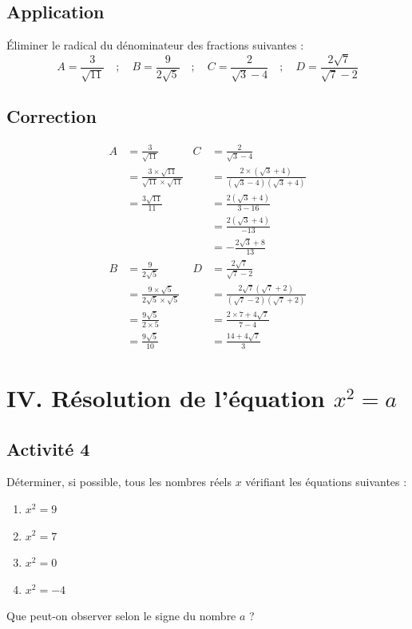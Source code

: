 \documentclass[12pt,a4paper]{article}
\begin{document}
\subsection*{\color{myred} Application }
\begin{tcolorbox}[colback=red!5!white,colframe=myred,title=\textbf{Application}]
Éliminer le radical du dénominateur des fractions suivantes :
\[
A = \frac{3}{\sqrt{11}} \quad;\quad B = \frac{9}{2\sqrt{5}} \quad;\quad C = \frac{2}{\sqrt{3} - 4} \quad;\quad D = \frac{2\sqrt{7}}{\sqrt{7} - 2}
\]
\end{tcolorbox}
\subsection*{\color{myred} Correction }
\begin{align*}
A &= \frac{3}{\sqrt{11}} & C &= \frac{2}{\sqrt{3} - 4} \\
&= \frac{3 \times \sqrt{11}}{\sqrt{11} \times \sqrt{11}} & &= \frac{2 \times \left(\sqrt{3} + 4\right)}{\left(\sqrt{3} - 4\right)\left(\sqrt{3} + 4\right)} \\
&= \frac{3\sqrt{11}}{11} & &= \frac{2\left(\sqrt{3} + 4\right)}{3 - 16} \\
& & &= \frac{2\left(\sqrt{3} + 4\right)}{-13} \\
& & &= -\frac{2\sqrt{3} + 8}{13} \\[1.5em]
B &= \frac{9}{2\sqrt{5}} & D &= \frac{2\sqrt{7}}{\sqrt{7} - 2} \\
&= \frac{9 \times \sqrt{5}}{2\sqrt{5} \times \sqrt{5}} & &= \frac{2\sqrt{7}\left(\sqrt{7} + 2\right)}{\left(\sqrt{7} - 2\right)\left(\sqrt{7} + 2\right)} \\
&= \frac{9\sqrt{5}}{2 \times 5} & &= \frac{2 \times 7 + 4\sqrt{7}}{7 - 4} \\
&= \frac{9\sqrt{5}}{10} & &= \frac{14 + 4\sqrt{7}}{3}
\end{align*}
\section*{\color{myred}IV. Résolution de l'équation $x^{2}=a$}

\subsection*{\color{myred} Activité 4 }
Déterminer, si possible, tous les nombres réels $x$ vérifiant les équations suivantes :
\begin{enumerate}[label=\textbf{\arabic*.}]
    \item $x^2 = 9$
    \item $x^2 = 7$
    \item $x^2 = 0$
    \item $x^2 = -4$
\end{enumerate}
Que peut-on observer selon le signe du nombre $a$ ?
\end{document}

